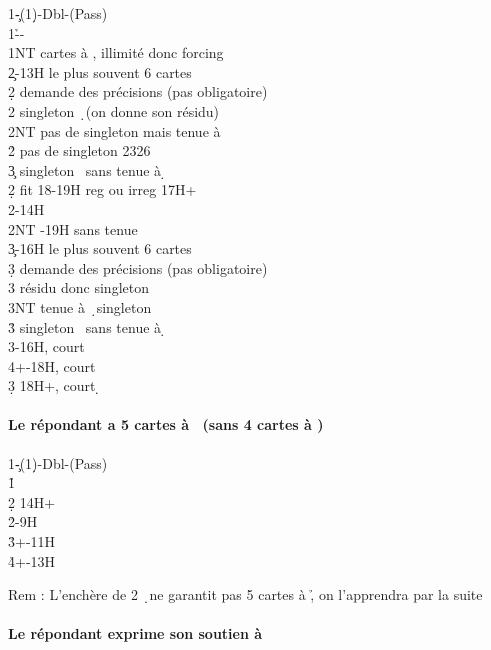 \documentclass[a4paper]{article}
\begin{document}
\begin{bidtable}
1\c-(1\d)-Dbl-(Pass)\\
1\h--\\
1NT  cartes à \s , illimité donc forcing\+\\
2\c {}-13H le plus souvent 6 cartes\+\\
2\d \> demande des précisions (pas obligatoire)\+\\
2\s \> singleton \d\ (on donne son résidu)\\
2NT \> pas de singleton mais tenue à \d \\
2\h \> pas de singleton 2326\\
3\c \> singleton \s\ sans tenue à \d \-\-\\
2\d \> fit 18-19H reg ou irreg 17H+\\
2\s {}-14H\\
2NT -19H sans tenue\\
3\c {}-16H le plus souvent 6 cartes\+\\
3\d \> demande des précisions (pas obligatoire)\+\\
3\s \> résidu donc singleton \d \\
3NT \> tenue à \d\ singleton \s \\
3\h \> singleton \s\ sans tenue à \d \-\-\\
3\s {}-16H, court \d \\
4\s {}+-18H, court \d \\
3\d \> 18H+, court \d \-
\end{bidtable}

\paragraph{Le répondant a 5 cartes à \pdfh\ (sans 4 cartes à \pdfs)}

\begin{bidtable}
1\c-(1\d)-Dbl-(Pass)\\
1\h\+\\
2\d \> 14H+\\
2\h {}-9H\\
3\h {}+-11H\\
4\h {}+-13H\-
\end{bidtable}

Rem : L’enchère de 2 \d\ ne garantit pas 5 cartes à \h , on l’apprendra par la suite

\paragraph{Le répondant exprime son soutien à \pdfc}
\end{document}
